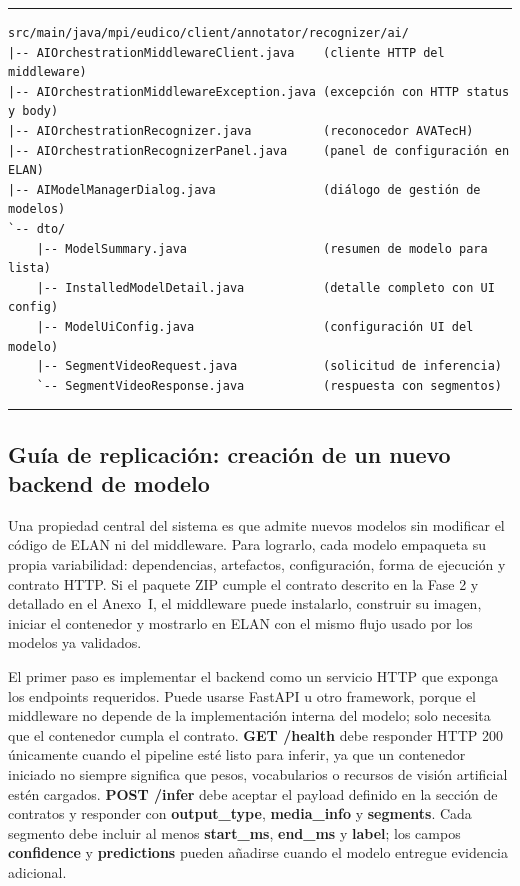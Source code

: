 \documentclass[11pt,a4paper]{article}
\begin{document}
\begin{center}
\begin{minipage}{0.96\textwidth}
\hrule
\vspace{0.10cm}
\scriptsize
\begin{Verbatim}[baselinestretch=0.72]
src/main/java/mpi/eudico/client/annotator/recognizer/ai/
|-- AIOrchestrationMiddlewareClient.java    (cliente HTTP del middleware)
|-- AIOrchestrationMiddlewareException.java (excepción con HTTP status y body)
|-- AIOrchestrationRecognizer.java          (reconocedor AVATecH)
|-- AIOrchestrationRecognizerPanel.java     (panel de configuración en ELAN)
|-- AIModelManagerDialog.java               (diálogo de gestión de modelos)
`-- dto/
    |-- ModelSummary.java                   (resumen de modelo para lista)
    |-- InstalledModelDetail.java           (detalle completo con UI config)
    |-- ModelUiConfig.java                  (configuración UI del modelo)
    |-- SegmentVideoRequest.java            (solicitud de inferencia)
    `-- SegmentVideoResponse.java           (respuesta con segmentos)
\end{Verbatim}
\vspace{0.03cm}
\hrule

\label{lst:estructura_clases_elan}
\end{minipage}
\end{center}


\subsection{Guía de replicación: creación de un nuevo backend de modelo}

Una propiedad central del sistema es que admite nuevos modelos sin modificar el código de ELAN ni del middleware. Para lograrlo, cada modelo empaqueta su propia variabilidad: dependencias, artefactos, configuración, forma de ejecución y contrato HTTP. Si el paquete ZIP cumple el contrato descrito en la Fase 2 y detallado en el Anexo~I, el middleware puede instalarlo, construir su imagen, iniciar el contenedor y mostrarlo en ELAN con el mismo flujo usado por los modelos ya validados.

El primer paso es implementar el backend como un servicio HTTP que exponga los endpoints requeridos. Puede usarse FastAPI u otro framework, porque el middleware no depende de la implementación interna del modelo; solo necesita que el contenedor cumpla el contrato. \textbf{GET /health} debe responder HTTP 200 únicamente cuando el pipeline esté listo para inferir, ya que un contenedor iniciado no siempre significa que pesos, vocabularios o recursos de visión artificial estén cargados. \textbf{POST /infer} debe aceptar el payload definido en la sección de contratos y responder con \textbf{output\_type}, \textbf{media\_info} y \textbf{segments}. Cada segmento debe incluir al menos \textbf{start\_ms}, \textbf{end\_ms} y \textbf{label}; los campos \textbf{confidence} y \textbf{predictions} pueden añadirse cuando el modelo entregue evidencia adicional.
\end{document}
